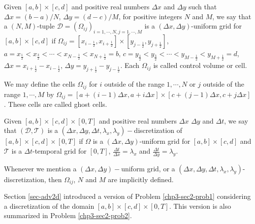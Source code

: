 \begin{definition}
	\label{chp2-def-2dgrid}
	Given $[a,b]\times [c,d]$ and positive real numbers $\Delta x$ and $\Delta y$ such that $\Delta x = (b-a)/N$, 
	$\Delta y = (d-c)/M$, for positive integers $N$ and $M$,
	we say that a $(N,M)$-tuple $\mathcal{D}=(\Omega_{ij})_{i=1,\cdots,N,j=1,\cdots,M}$ is a $(\Delta x, \Delta y)$-uniform grid for $[a,b]\times [c,d]$ if
	$\Omega_{ij} = [x_{i-\frac{1}{2}}, x_{i+\frac{1}{2}}]\times [y_{j-\frac{1}{2}}, y_{j+\frac{1}{2}}]$, 
	$a = x_{\frac{1}{2}} < x_{\frac{3}{2}} < \cdots < x_{N-\frac{1}{2}} < x_{N+\frac{1}{2}} = b$,
	$c = y_{\frac{1}{2}} < y_{\frac{3}{2}} < \cdots < y_{M-\frac{1}{2}} < y_{M+\frac{1}{2}} = d$,
	$\Delta x = x_{i+\frac{1}{2}}-x_{i-\frac{1}{2}}$, 	$\Delta y = y_{j+\frac{1}{2}}-y_{j-\frac{1}{2}}$.
	Each $\Omega_{ij}$ is called control volume or cell.
\end{definition}
\begin{remark}
	We may define the cells $\Omega_{ij}$ for $i$ outside of the range $1,\cdots, N$ or $j$ outside of the range $1,\cdots, M$  by 
	$\Omega_{ij} = [a+(i-1)\Delta x,a+i\Delta x]\times [c+(j-1)\Delta x,c+j\Delta x]$.  These cells are called ghost cells.
\end{remark}
\begin{definition}
	\label{chp2-def-dxdytimegrid}
	Given $[a,b]\times[c,d]\times [0,T]$ and positive real numbers $\Delta x$ $\Delta y$ and $\Delta t$, we say that $(\mathcal{D},\mathcal{T})$ is a
	$(\Delta x,\Delta y,\Delta t, \lambda_x, \lambda_y)-$discretization of $[a,b]\times[c,d]\times [0,T]$ if $\Omega$ is a $(\Delta x,\Delta y)$-uniform 
	grid for $[a,b]\times[c,d]$ and $\mathcal{T}$ is a $\Delta t$-temporal grid for $[0,T]$, $\frac{\Delta t}{\Delta x} = \lambda_x$
	and  $\frac{\Delta t}{\Delta y} = \lambda_y$.
\end{definition}
\begin{remark}
	Whenever we mention a $(\Delta x,\Delta y)-$uniform grid, or a $(\Delta x,\Delta y,\Delta t, \lambda_x, \lambda_y)$-discretization,
	then $\Omega_{ij}$, $N$ and $M$ are implicitly defined.
\end{remark}
Section \ref{sec-adv2d} introduced a version of Problem \ref{chp3-sec2-prob1}
considering a discretization of the domain $[a,b] \times [c,d] \times[0,T]$. 
This version is also summarized in Problem \ref{chp3-sec2-prob2}.	

